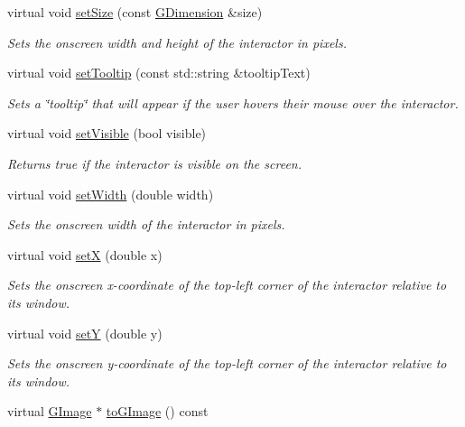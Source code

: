 \begin{DoxyCompactItemize}
virtual void \mbox{\hyperlink{classGInteractor_ae2b628228f192c2702c4ce941b2af68f}{set\+Size}} (const \mbox{\hyperlink{structGDimension}{G\+Dimension}} \&size)
\begin{DoxyCompactList}\small\item\em Sets the onscreen width and height of the interactor in pixels. \end{DoxyCompactList}\item 
virtual void \mbox{\hyperlink{classGInteractor_a039e0e49beaecc275efce02d416acea8}{set\+Tooltip}} (const std\+::string \&tooltip\+Text)
\begin{DoxyCompactList}\small\item\em Sets a \char`\"{}tooltip\char`\"{} that will appear if the user hovers their mouse over the interactor. \end{DoxyCompactList}\item 
virtual void \mbox{\hyperlink{classGInteractor_a18e44e30b31525a243960ca3928125aa}{set\+Visible}} (bool visible)
\begin{DoxyCompactList}\small\item\em Returns true if the interactor is visible on the screen. \end{DoxyCompactList}\item 
virtual void \mbox{\hyperlink{classGInteractor_aa3f3fba4cb131baa8696ba01e3bceca1}{set\+Width}} (double width)
\begin{DoxyCompactList}\small\item\em Sets the onscreen width of the interactor in pixels. \end{DoxyCompactList}\item 
virtual void \mbox{\hyperlink{classGInteractor_a9c18fcc579333bf9653d13ad2b372e39}{setX}} (double x)
\begin{DoxyCompactList}\small\item\em Sets the onscreen x-\/coordinate of the top-\/left corner of the interactor relative to its window. \end{DoxyCompactList}\item 
virtual void \mbox{\hyperlink{classGInteractor_a7d57e2a5c35d27feb58fd498a3cf82b9}{setY}} (double y)
\begin{DoxyCompactList}\small\item\em Sets the onscreen y-\/coordinate of the top-\/left corner of the interactor relative to its window. \end{DoxyCompactList}\item 
virtual \mbox{\hyperlink{classGImage}{G\+Image}} $\ast$ \mbox{\hyperlink{classGCanvas_aa2b5affed24054a09bddfe568d11200b}{to\+G\+Image}} () const

\end{DoxyCompactItemize}
